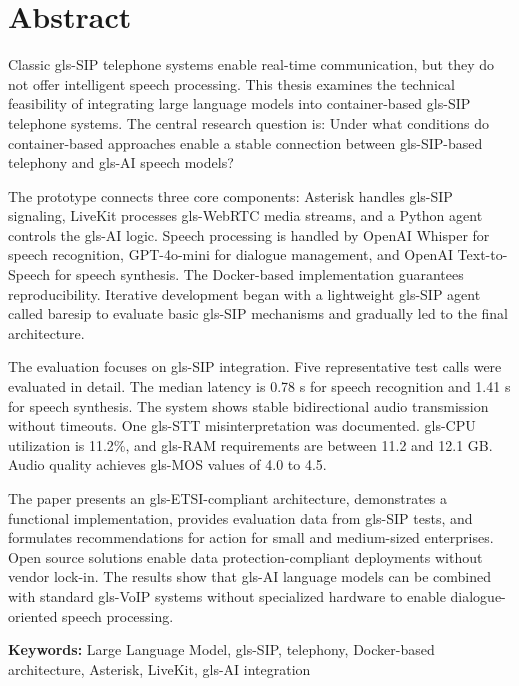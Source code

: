 \chapter*{Abstract}
\thispagestyle{scrheadings}

Classic \gls{gls-SIP} telephone systems enable real-time communication, but they do not offer intelligent speech processing. This thesis examines the technical feasibility of integrating large language models into container-based \gls{gls-SIP} telephone systems. The central research question is: Under what conditions do container-based approaches enable a stable connection between \gls{gls-SIP}-based telephony and \gls{gls-AI} speech models?

The prototype connects three core components: Asterisk handles \gls{gls-SIP} signaling, LiveKit processes \gls{gls-WebRTC} media streams, and a Python agent controls the \gls{gls-AI} logic. Speech processing is handled by OpenAI Whisper for speech recognition, GPT-4o-mini for dialogue management, and OpenAI Text-to-Speech for speech synthesis. The Docker-based implementation guarantees reproducibility. Iterative development began with a lightweight \gls{gls-SIP} agent called baresip to evaluate basic \gls{gls-SIP} mechanisms and gradually led to the final architecture.

The evaluation focuses on \gls{gls-SIP} integration. Five representative test calls were evaluated in detail. The median latency is 0.78 s for speech recognition and 1.41 s for speech synthesis. The system shows stable bidirectional audio transmission without timeouts. One \gls{gls-STT} misinterpretation was documented. \gls{gls-CPU} utilization is 11.2\%, and \gls{gls-RAM} requirements are between 11.2 and 12.1 GB. Audio quality achieves \gls{gls-MOS} values of 4.0 to 4.5.

The paper presents an \gls{gls-ETSI}-compliant architecture, demonstrates a functional implementation, provides evaluation data from \gls{gls-SIP} tests, and formulates recommendations for action for small and medium-sized enterprises. Open source solutions enable data protection-compliant deployments without vendor lock-in. The results show that \gls{gls-AI} language models can be combined with standard \gls{gls-VoIP} systems without specialized hardware to enable dialogue-oriented speech processing.

\noindent\textbf{Keywords:} Large Language Model, \gls{gls-SIP}, telephony, Docker-based architecture, Asterisk, LiveKit, \gls{gls-AI} integration
